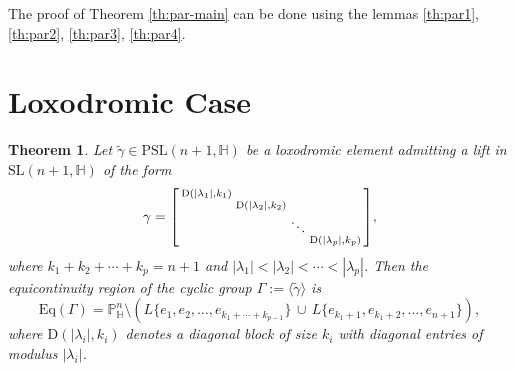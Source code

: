 \documentclass[12pt,reqno]{amsart}
\numberwithin{equation}{section}
\newtheorem{theorem}{Theorem}[section]
\theoremstyle{definition}
\def\H{\mathbb H}
\def\P{\mathbb P}
\def\H{\mathbb {H}}
\begin{document}
The proof of Theorem \ref{th:par-main} can be done using the lemmas \ref{th:par1}, \ref{th:par2}, \ref{th:par3}, \ref{th:par4}.




\section{Loxodromic Case}\label{sec:loxodromic}
\begin{theorem}
\label{th:loxodromic}
Let $\tilde{\gamma} \in \mathrm{PSL}(n+1,\mathbb{H})$ be a loxodromic element admitting a lift in $\mathrm{SL}(n+1,\mathbb{H})$ of the form
\[
\gamma =
\begin{bsmallmatrix}
    \mathrm{D}(|\lambda_1|, k_1) & & & \\
    & \mathrm{D}(|\lambda_2|, k_2) & & \\
    & & \ddots & \\
    & & & \mathrm{D}(|\lambda_p|, k_p)
\end{bsmallmatrix},
\]
where $k_1 + k_2 + \cdots + k_p = n+1$ and 
$|\lambda_1| < |\lambda_2| < \cdots < |\lambda_p|$.
Then the equicontinuity region of the cyclic group 
$\Gamma := \langle \tilde{\gamma} \rangle$ is
\[
\mathrm{Eq}(\Gamma)
=\P^n_\H\setminus\left( L\{e_1, e_2, \ldots, e_{k_1 + \cdots + k_{p-1}}\}
\, \cup \,
L\{e_{k_1 + 1}, e_{k_1 + 2}, \ldots, e_{n+1}\}\right),
\]
where $\mathrm{D}(|\lambda_i|, k_i)$ denotes a diagonal block of size $k_i$ with diagonal entries of modulus $|\lambda_i|$.
\end{theorem}
\end{document}
